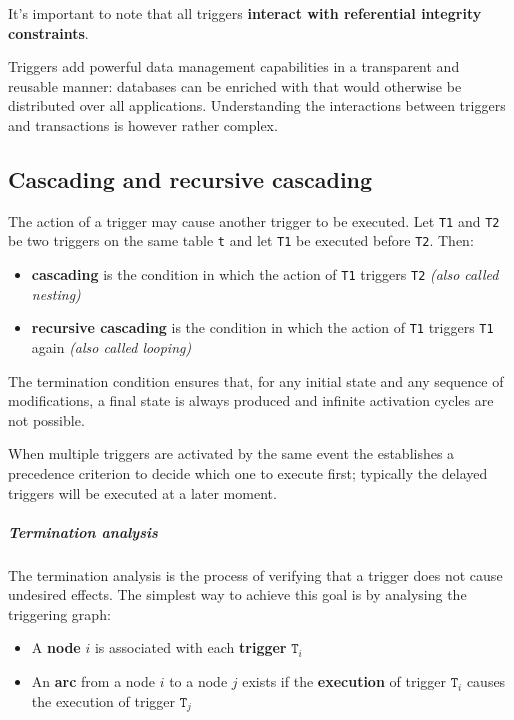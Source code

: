 \documentclass[english]{article}
\begin{document}
It's important to note that all triggers \textbf{interact with referential integrity constraints}.

\bigskip
Triggers add powerful data management capabilities in a transparent and reusable manner:
databases can be enriched with  that would otherwise be distributed over all applications.
Understanding the interactions between triggers and transactions is however rather complex.

\subsection{Cascading and recursive cascading}

The action of a trigger may cause another trigger to be executed.
Let \texttt{T1} and \texttt{T2} be two triggers on the same table \texttt{t} and let \texttt{T1} be executed before \texttt{T2}.
Then:

\begin{itemize}
  \item \textbf{cascading} is the condition in which the action of \texttt{T1} triggers \texttt{T2} \textit{(also called nesting)}
  \item \textbf{recursive cascading} is the condition in which the action of \texttt{T1} triggers \texttt{T1} again \textit{(also called looping)}
\end{itemize}

The termination condition ensures that, for any initial state and any sequence of modifications, a final state is always produced and infinite activation cycles are not possible.

\bigskip
When multiple triggers are activated by the same event the \dbms establishes a precedence criterion to decide which one to execute first;
typically the delayed triggers will be executed at a later moment.

\subparagraph*{Termination analysis}
The termination analysis is the process of verifying that a trigger does not cause undesired effects.
The simplest way to achieve this goal is by analysing the triggering graph:

\begin{itemize}
  \item A \textbf{node} \(i\) is associated with each \textbf{trigger} \(\texttt{T}_i\)
  \item An \textbf{arc} from a node \(i\) to a node \(j\) exists if the \textbf{execution} of trigger \(\texttt{T}_i\) causes the execution of trigger \(\texttt{T}_j\)
\end{itemize}
\end{document}
